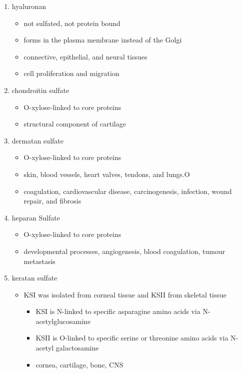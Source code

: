 \documentclass{scrartcl}
\begin{document}
\begin{enumerate}
\item hyaluronan
\label{sec:org1f78ebb}
\begin{itemize}
\item not sulfated, not protein bound
\item forms in the plasma membrane instead of the Golgi
\item connective, epithelial, and neural tissues
\item cell proliferation and migration
\end{itemize}

\item chondroitin sulfate
\label{sec:org5973333}
\begin{itemize}
\item O-xylose-linked to core proteins
\item structural component of cartilage
\end{itemize}

\item dermatan sulfate
\label{sec:org2ac4bd0}
\begin{itemize}
\item O-xylose-linked to core proteins
\item skin, blood vessels, heart valves, tendons, and lungs.O
\item coagulation, cardiovascular disease, carcinogenesis, infection, wound repair, and fibrosis
\end{itemize}

\item heparan Sulfate
\label{sec:orgefda289}
\begin{itemize}
\item O-xylose-linked to core proteins
\item developmental processes, angiogenesis, blood coagulation, tumour metastasis
\end{itemize}

\item keratan sulfate
\label{sec:org1144c18}
\begin{itemize}
\item KSI was isolated from corneal tissue and KSII from skeletal tissue
\begin{itemize}
\item KSI is N-linked to specific asparagine amino acids via
N-acetylglucosamine
\item KSII is O-linked to specific serine or threonine amino acids via
N-acetyl galactosamine
\item cornea, cartilage, bone, CNS
\end{itemize}
\end{itemize}



\end{enumerate}
\end{document}
